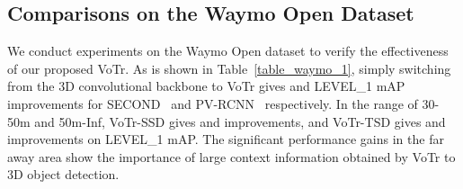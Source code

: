 \documentclass[10pt,twocolumn,letterpaper]{article}
\begin{document}
\begin{table}[]
\setlength{\belowcaptionskip}{10pt}
\caption{Performance comparison on the KITTI \textit{val} split with AP calculated by  recall positions for the car category.} \label{table_kitti_2}
\vspace{-4mm}
\end{table}

\subsection{Comparisons on the Waymo Open Dataset} \label{3D Detection on the Waymo Open Dataset} 
We conduct experiments on the Waymo Open dataset to verify the effectiveness of our proposed VoTr. As is shown in Table~\ref{table_waymo_1}, simply switching from the 3D convolutional backbone to VoTr gives  and  LEVEL\_1 mAP improvements for SECOND~\cite{yan2018second} and PV-RCNN~\cite{shi2020pv} respectively. In the range of 30-50m and 50m-Inf, VoTr-SSD gives  and  improvements, and VoTr-TSD gives  and  improvements on LEVEL\_1 mAP. The significant performance gains in the far away area show the importance of large context information obtained by VoTr to 3D object detection.
\end{document}
